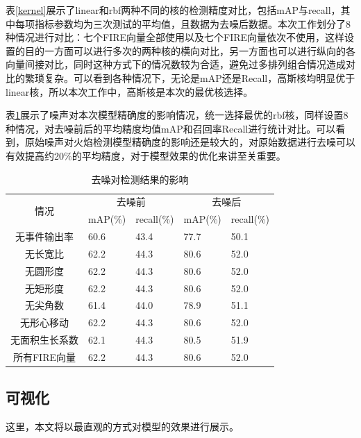 表\ref{kernel}展示了linear和rbf两种不同的核的检测精度对比，包括mAP与recall，其中每项指标参数均为三次测试的平均值，且数据为去噪后数据。本次工作划分了8种情况进行对比：七个FIRE向量全部使用以及七个FIRE向量依次不使用，这样设置的目的一方面可以进行多次的两种核的横向对比，另一方面也可以进行纵向的各向量间接对比，同时这种方式下的情况数较为合适，避免过多排列组合情况造成对比的繁琐复杂。可以看到各种情况下，无论是mAP还是Recall，高斯核均明显优于linear核，所以本次工作中，高斯核是本次的最优核选择。

表\ref{denoise}展示了噪声对本次模型精确度的影响情况，统一选择最优的rbf核，同样设置8种情况，对去噪前后的平均精度均值mAP和召回率Recall进行统计对比。可以看到，原始噪声对火焰检测模型精确度的影响还是较大的，对原始数据进行去噪可以有效提高约20\%的平均精度，对于模型效果的优化来讲至关重要。

\begin{table}[ht]
    \centering
    \caption{去噪对检测结果的影响}
    \begin{tabularx}{\textwidth}{c|X|X|X|X}
    \toprule
    \multicolumn{1}{c|}{\multirow{2}{*}{情况}} & \multicolumn{2}{c|}{去噪前} & \multicolumn{2}{c}{去噪后} \\ \cmidrule(l){2-5} 
    \multicolumn{1}{c|}{}  & mAP(\%)     & recall(\%)    & mAP(\%)   & recall(\%)  \\
    \midrule
    无事件输出率             &60.6       &43.4       &77.7       &50.1       \\
    无长宽比                &62.2       &44.3       &80.6       &52.0       \\
    无圆形度                &62.2       &44.3       &80.6       &52.0       \\
    无矩形度                &62.2       &44.3       &80.6       &52.0       \\
    无尖角数                &61.4       &44.0       &78.9       &51.1       \\
    无形心移动              &62.2       &44.3       &80.6       &52.0       \\
    无面积生长系数           &62.1       &44.3       &80.5       &51.9       \\
    所有FIRE向量             &62.2       &44.3       &80.6       &52.0       \\
    \bottomrule
    \end{tabularx}
    \label{denoise}
\end{table}

\subsection{可视化}
这里，本文将以最直观的方式对模型的效果进行展示。

